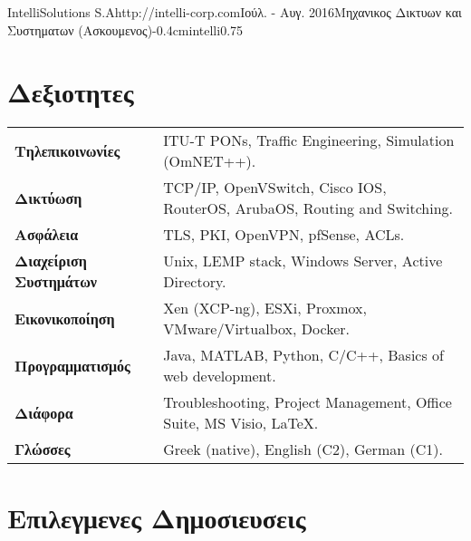 \documentclass{mycv}
\begin{document}
	\vspace*{0.75cm}	

	\begin{EntryDatedLogo}{IntelliSolutions S.A}{http://intelli-corp.com}{Ιούλ. - Αυγ. 2016}{Μηχανικος Δικτυων και Συστηματων (Ασκουμενος)}{-0.4cm}{intelli}{0.75}
	\end{EntryDatedLogo}
	\newpage
	\section{Δεξιοτητες}
	\begin{tabular}{m{4.5cm} m{13cm}}\renewcommand{\arraystretch}{2}
		\textbf{Τηλεπικοινωνίες}   		& ITU-T PONs, Traffic Engineering, Simulation (OmNET++). \\
		\textbf{Δικτύωση}   			& TCP/IP, OpenVSwitch, Cisco IOS, RouterOS, ArubaOS, Routing and Switching.\\
		\textbf{Ασφάλεια}				& TLS, PKI, OpenVPN, pfSense, ACLs. \\
		\textbf{Διαχείριση Συστημάτων}	& Unix, LEMP stack, Windows Server, Active Directory. \\
		\textbf{Εικονικοποίηση}			& Xen (XCP-ng), ESXi, Proxmox, VMware/Virtualbox, Docker.\\ 
		\textbf{Προγραμματισμός} 	    & Java, MATLAB, Python, C/C++, Basics of web development. \\
		\textbf{Διάφορα}				& Troubleshooting, Project Management, Office Suite, MS Visio, \LaTeX. \\
		\textbf{Γλώσσες} 				& Greek (native), English (C2), German (C1). 
	\end{tabular}
	
	\section{Επιλεγμενες Δημοσιευσεις}
	
\end{document}
